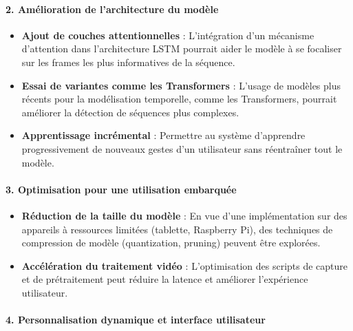 \documentclass[
]{article}
\begin{document}
\hypertarget{amuxe9lioration-de-larchitecture-du-moduxe8le}{%
\paragraph{\texorpdfstring{\textbf{2. Amélioration de l'architecture du modèle}}{2. Amélioration de l'architecture du modèle}}\label{amuxe9lioration-de-larchitecture-du-moduxe8le}}

\begin{itemize}
\item
  \textbf{Ajout de couches attentionnelles} : L'intégration d'un mécanisme d'attention dans l'architecture LSTM pourrait aider le modèle à se focaliser sur les frames les plus informatives de la séquence.
\item
  \textbf{Essai de variantes comme les Transformers} : L'usage de modèles plus récents pour la modélisation temporelle, comme les Transformers, pourrait améliorer la détection de séquences plus complexes.
\item
  \textbf{Apprentissage incrémental} : Permettre au système d'apprendre progressivement de nouveaux gestes d'un utilisateur sans réentraîner tout le modèle.
\end{itemize}

\hypertarget{optimisation-pour-une-utilisation-embarquuxe9e}{%
\paragraph{\texorpdfstring{\textbf{3. Optimisation pour une utilisation embarquée}}{3. Optimisation pour une utilisation embarquée}}\label{optimisation-pour-une-utilisation-embarquuxe9e}}

\begin{itemize}
\item
  \textbf{Réduction de la taille du modèle} : En vue d'une implémentation sur des appareils à ressources limitées (tablette, Raspberry Pi), des techniques de compression de modèle (quantization, pruning) peuvent être explorées.
\item
  \textbf{Accélération du traitement vidéo} : L'optimisation des scripts de capture et de prétraitement peut réduire la latence et améliorer l'expérience utilisateur.
\end{itemize}

\hypertarget{personnalisation-dynamique-et-interface-utilisateur}{%
\paragraph{\texorpdfstring{\textbf{4. Personnalisation dynamique et interface utilisateur}}{4. Personnalisation dynamique et interface utilisateur}}\label{personnalisation-dynamique-et-interface-utilisateur}}
\end{document}
